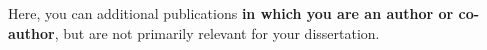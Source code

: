 

Here, you can additional publications \textbf{in which you are an author or co-author}, but are not primarily relevant for your dissertation.